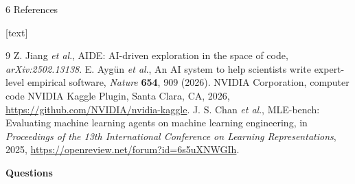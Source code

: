 \documentclass[aspectratio=169,10pt,t]{beamer}
\newcommand{\etal}{\textit{et al}.}
\begin{document}
\begin{frame}{6 References}
  \vspace{2mm}
  {\small\color{ink}
   [text]
   \begin{thebibliography}{9}
   \setlength{\itemsep}{0.4mm}
    Z. Jiang \etal, AIDE: AI-driven exploration in the
     space of code, \emph{arXiv:2502.13138}.
    E. Ayg\"un \etal, An AI system to help scientists write
     expert-level empirical software, \emph{Nature} \textbf{654}, 909 (2026).
    NVIDIA Corporation, computer code NVIDIA Kaggle Plugin,
     Santa Clara, CA, 2026, \url{https://github.com/NVIDIA/nvidia-kaggle}.
    J. S. Chan \etal, MLE-bench: Evaluating machine learning
     agents on machine learning engineering, in \emph{Proceedings of the 13th
     International Conference on Learning Representations}, 2025,
     \url{https://openreview.net/forum?id=6s5uXNWGIh}.
   \end{thebibliography}}
  

\end{frame}

\begin{frame}[plain,c]
  \vfill
  \centerline{\color{ink}\LARGE\bfseries Questions}
  \vfill

\end{frame}
\end{document}
